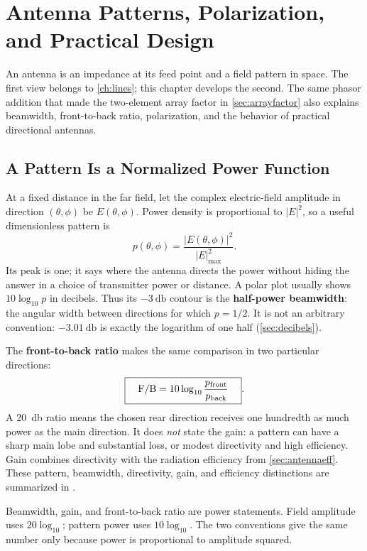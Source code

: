 \chapter{Antenna Patterns, Polarization, and Practical Design}
\label{ch:antennapatterns}
An antenna is an impedance at its feed point and a field pattern in space. The
first view belongs to \cref{ch:lines}; this chapter develops the second. The
same phasor addition that made the two-element array factor in
\cref{sec:arrayfactor} also explains beamwidth, front-to-back ratio,
polarization, and the behavior of practical directional antennas.

\section{A Pattern Is a Normalized Power Function}
\label{sec:patternmetrics}
At a fixed distance in the far field, let the complex electric-field amplitude
in direction \((\theta,\phi)\) be \(E(\theta,\phi)\).  Power density is
proportional to \(|E|^2\), so a useful dimensionless pattern is
\[
p(\theta,\phi)=\frac{|E(\theta,\phi)|^2}
                       {|E|^2_{\max}}.
\]
Its peak is one; it says where the antenna directs the power without hiding the
answer in a choice of transmitter power or distance.  A polar plot usually shows
\(10\log_{10}p\) in decibels.  Thus its \(-\SI{3}{\decibel}\) contour is the
\textbf{half-power beamwidth}: the angular width between directions for which
\(p=1/2\).  It is not an arbitrary convention: \(-\SI{3.01}{\decibel}\) is
exactly the logarithm of one half (\cref{sec:decibels}).

The \textbf{front-to-back ratio} makes the same comparison in two particular
directions:
\[
\boxed{\quad\mathrm{F/B}=10\log_{10}\frac{p_{\rm front}}{p_{\rm back}}\quad}.
\]
A \SI{20}{\decibel} ratio means the chosen rear direction receives one hundredth
as much power as the main direction.  It does \emph{not} state the gain: a pattern
can have a sharp main lobe and substantial loss, or modest directivity and high
efficiency.  Gain combines directivity with the radiation efficiency from
\cref{sec:antennaeff}.
These pattern, beamwidth, directivity, gain, and efficiency distinctions are summarized
in \cite[pp.~359--363]{free2022rfmicrowave}.

\begin{exambox}
Beamwidth, gain, and front-to-back ratio are power statements.  Field amplitude
uses \(20\log_{10}\); pattern power uses \(10\log_{10}\).  The two conventions
give the same number only because power is proportional to amplitude squared.
\end{exambox}

